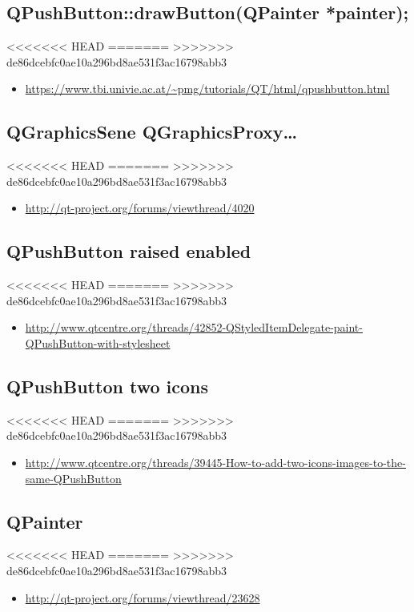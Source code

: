 \documentclass[9pt,b5paper]{article}
\begin{document}
\subsection{QPushButton::drawButton(QPainter *painter);}
<<<<<<< HEAD
\label{sec-18-5}
=======
\label{sec-17-5}
>>>>>>> de86dcebfc0ae10a296bd8ae531f3ac16798abb3
\begin{itemize}
\item \url{https://www.tbi.univie.ac.at/~pmg/tutorials/QT/html/qpushbutton.html}
\end{itemize}
\subsection{QGraphicsSene QGraphicsProxy\ldots{}}
<<<<<<< HEAD
\label{sec-18-6}
=======
\label{sec-17-6}
>>>>>>> de86dcebfc0ae10a296bd8ae531f3ac16798abb3
\begin{itemize}
\item \url{http://qt-project.org/forums/viewthread/4020}
\end{itemize}
\subsection{QPushButton raised enabled}
<<<<<<< HEAD
\label{sec-18-7}
=======
\label{sec-17-7}
>>>>>>> de86dcebfc0ae10a296bd8ae531f3ac16798abb3
\begin{itemize}
\item \url{http://www.qtcentre.org/threads/42852-QStyledItemDelegate-paint-QPushButton-with-stylesheet}
\end{itemize}
\subsection{QPushButton two icons}
<<<<<<< HEAD
\label{sec-18-8}
=======
\label{sec-17-8}
>>>>>>> de86dcebfc0ae10a296bd8ae531f3ac16798abb3
\begin{itemize}
\item \url{http://www.qtcentre.org/threads/39445-How-to-add-two-icons-images-to-the-same-QPushButton}
\end{itemize}
\subsection{QPainter}
<<<<<<< HEAD
\label{sec-18-9}
=======
\label{sec-17-9}
>>>>>>> de86dcebfc0ae10a296bd8ae531f3ac16798abb3
\begin{itemize}
\item \url{http://qt-project.org/forums/viewthread/23628}
\end{itemize}
\end{document}
